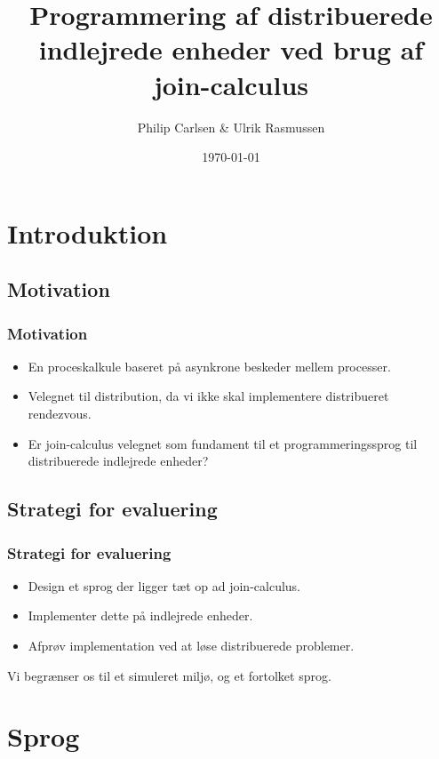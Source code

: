 \documentclass{beamer}
\title[Bacheorprojektforsvar]{Programmering af distribuerede indlejrede enheder ved brug af join-calculus}
\author{Philip Carlsen \& Ulrik Rasmussen}
\institute{\textrm{Datalogisk Institut, Københavns Universitet}}
\date{\today}
\begin{document}
\frame{\titlepage}

\section{Introduktion}

\subsection{Motivation}

\begin{frame}
\frametitle{Motivation}

\begin{itemize}
\item
    En proceskalkule baseret på asynkrone beskeder mellem processer.

\item
    Velegnet til distribution, da vi ikke skal implementere distribueret rendezvous.

\item
    Er join-calculus velegnet som fundament til et programmeringssprog til
    distribuerede indlejrede enheder?
\end{itemize}
\end{frame}


\subsection{Strategi for evaluering}

\begin{frame}
\frametitle{Strategi for evaluering}

\begin{itemize}
 \item Design et sprog der ligger tæt op ad join-calculus.
 \item Implementer dette på indlejrede enheder.
 \item Afprøv implementation ved at løse distribuerede problemer.
\end{itemize}

Vi begrænser os til et simuleret miljø, og et fortolket sprog.

\end{frame}


\section{Sprog}
\end{document}
